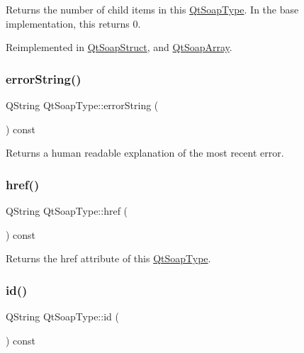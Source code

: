 Returns the number of child items in this \mbox{\hyperlink{class_qt_soap_type}{Qt\+Soap\+Type}}. In the base implementation, this returns 0. 

Reimplemented in \mbox{\hyperlink{class_qt_soap_struct_a3ae0552d2991d545b285e66bbaad560f}{Qt\+Soap\+Struct}}, and \mbox{\hyperlink{class_qt_soap_array_a5cf3ee6dc1faf7198be24fcfdf0e3bb8}{Qt\+Soap\+Array}}.

\mbox{\label{class_qt_soap_type_ab7f88790ce3629b5a6d86c13e67cfb23}} 
\subsubsection{\texorpdfstring{error\+String()}{errorString()}}
{\footnotesize\ttfamily Q\+String Qt\+Soap\+Type\+::error\+String (\begin{DoxyParamCaption}{ }\end{DoxyParamCaption}) const}

Returns a human readable explanation of the most recent error. \mbox{\label{class_qt_soap_type_a47872406cda4698fc49b7fd5817bbd71}} 
\subsubsection{\texorpdfstring{href()}{href()}}
{\footnotesize\ttfamily Q\+String Qt\+Soap\+Type\+::href (\begin{DoxyParamCaption}{ }\end{DoxyParamCaption}) const\hspace{0.3cm}{\ttfamily [virtual]}}

Returns the href attribute of this \mbox{\hyperlink{class_qt_soap_type}{Qt\+Soap\+Type}}. \mbox{\label{class_qt_soap_type_a77376306cd4807467b3d97ff8ce68ff5}} 
\subsubsection{\texorpdfstring{id()}{id()}}
{\footnotesize\ttfamily Q\+String Qt\+Soap\+Type\+::id (\begin{DoxyParamCaption}{ }\end{DoxyParamCaption}) const\hspace{0.3cm}{\ttfamily [virtual]}}

